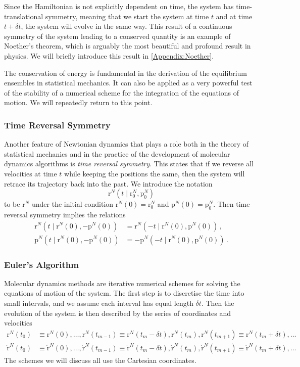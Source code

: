 \documentclass{article}
\theoremstyle{plain}\theoremheaderfont{\normalfont\itshape}\theorembodyfont{\rmfamily}\theoremseparator{.}\newtheorem*{rem}{Remark}\newtheorem*{ex}{Example}\newtheorem*{proof}{Proof}\newtheorem*{altp}{Alternative proof}
\theoremstyle{plain}\theoremheaderfont{\normalfont\bfseries}\theorembodyfont{\rmfamily}\theoremseparator{.}\newtheorem{thm}{Theorem}[section]\newtheorem{lem}[thm]{Lemma}\newtheorem{prop}[thm]{Proposition}\newtheorem*{cor}{Corollary}\newtheorem{defn}[thm]{Definition}\newtheorem{clm}[thm]{Claim}\newtheorem{clminproof}{Claim}\newtheorem{alg}[thm]{Algorithm}\newtheorem{hyp}[thm]{Hypothesis}\newtheorem{law}[thm]{Law}
\theoremstyle{break}\theoremheaderfont{\normalfont\itshape}\theorembodyfont{\rmfamily}\theoremseparator{.\medskip}\newtheorem*{proofskip}{Proof}\newtheorem*{exs}{Examples}\newtheorem*{rems}{Remarks}
\theoremstyle{break}\theoremheaderfont{\normalfont\bfseries}\theorembodyfont{\rmfamily}\theoremseparator{.\medskip}\newtheorem{lemskip}[thm]{Lemma}\newtheorem{defnskip}[thm]{Definition}\newtheorem{propskip}[thm]{Proposition}\newtheorem{thmskip}[thm]{Theorem}
\numberwithin{equation}{section}
\newcommand{\vb}[1]{\bm{\mathrm{#1}}}
\begin{document}
    Since the Hamiltonian is not explicitly dependent on time, the system has time-translational symmetry, meaning that we start the system at time \(t\) and at time \(t+\delta t\), the system will evolve in the same way. This result of a continuous symmetry of the system leading to a conserved quantity is an example of Noether's theorem, which is arguably the most beautiful and profound result in physics. We will briefly introduce this result in \cref{Appendix:Noether}.

    The conservation of energy is fundamental in the derivation of the equilibrium ensembles in statistical mechanics. It can also be applied as a very powerful test of the stability of a numerical scheme for the integration of the equations of motion. We will repeatedly return to this point.

    \subsubsection*{Time Reversal Symmetry}
    Another feature of Newtonian dynamics that plays a role both in the theory of statistical mechanics and in the practice of the development of molecular dynamics algorithms is \textit{time reversal symmetry}. This states that if we reverse all velocities at time \(t\) while keeping the positions the same, then the system will retrace its trajectory back into the past. We introduce the notation
    \begin{equation}
        \vb{r}^N(t\mid \vb{r}_0^N,\vb{p}_0^N)
    \end{equation}
    to be \(\vb{r}^N\) under the initial condition \(\vb{r}^N(0)=\vb{r}_0^N\) and \(\vb{p}^N(0)=\vb{p}_0^N\). Then time reversal symmetry implies the relations
    \begin{align}
        \vb{r}^N(t\mid \vb{r}^N(0),-\vb{p}^N(0))&=\vb{r}^N(-t\mid\vb{r}^N(0),\vb{p}^N(0))\,,\\
        \vb{p}^N(t\mid \vb{r}^N(0),-\vb{p}^N(0))&=-\vb{p}^N(-t\mid\vb{r}^N(0),\vb{p}^N(0))\,.
    \end{align}

    \subsubsection{Euler's Algorithm}
    Molecular dynamics methods are iterative numerical schemes for solving the equations of motion of the system. The first step is to discretise the time into small intervals, and we assume each interval has equal length \(\delta t\). Then the evolution of the system is then described by the series of coordinates and velocities
    \begin{align}
        \vb{r}^N(t_0)&\equiv\vb{r}^N(0),\dots,\vb{r}^N(t_{m-1})\equiv\vb{r}^N(t_{m}-\delta t),\vb{r}^N(t_m),\vb{r}^N(t_{m+1})\equiv\vb{r}^N(t_m+\delta t),\dots \\
        \dot{\vb{r}}^N(t_0)&\equiv\dot{\vb{r}}^N(0),\dots,\dot{\vb{r}}^N(t_{m-1})\equiv\dot{\vb{r}}^N(t_{m}-\delta t),\dot{\vb{r}}^N(t_m),\dot{\vb{r}}^N(t_{m+1})\equiv\dot{\vb{r}}^N(t_m+\delta t),\dots 
    \end{align}
    The schemes we will discuss all use the Cartesian coordinates.
\end{document}
